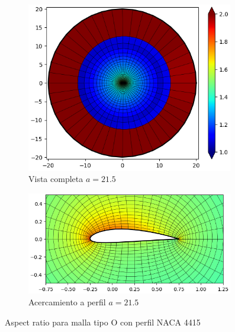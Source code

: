 \documentclass[letterpaper, openright, 12pt]{book}
\begin{document}
\begin{figure}[htbp!]
\begin{subfigure}[c]{0.48\textwidth}
            \includegraphics[keepaspectratio,
                width=0.99\textwidth]{./img/naca4415_aa_215_aspect_far}
            \caption{Vista completa $a=21.5$}
            \label{fig:naca4415_aa_215_aspect_far}
        \end{subfigure}
        \hfill
        \begin{subfigure}[c]{0.48\textwidth}
            \includegraphics[keepaspectratio,
                width=0.99\textwidth]{./img/naca4415_aa_215_aspect_close}
            \caption{Acercamiento a perfil $a=21.5$}
            \label{fig:naca4415_aa_215_aspect_close}
        \end{subfigure}
        \caption[Aspect ratio para malla tipo O con perfil NACA 4415]{Aspect
            ratio para malla tipo O con perfil NACA 4415}
            \label{fig:naca4415_aspect_1}
    \end{figure}
\end{document}
